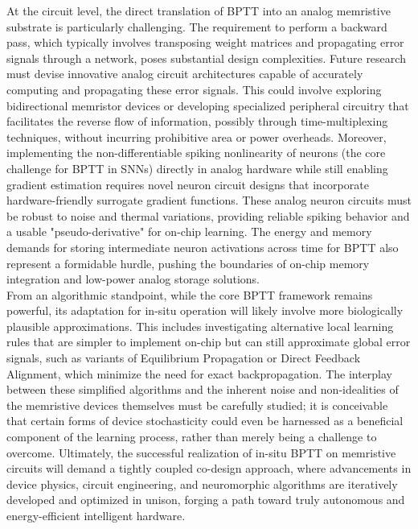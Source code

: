 \noindent At the circuit level, the direct translation of BPTT into an analog memristive substrate is particularly challenging. The requirement to perform a backward pass, which typically involves transposing weight matrices and propagating error signals through a network, poses substantial design complexities. Future research must devise innovative analog circuit architectures capable of accurately computing and propagating these error signals. This could involve exploring bidirectional memristor devices or developing specialized peripheral circuitry that facilitates the reverse flow of information, possibly through time-multiplexing techniques, without incurring prohibitive area or power overheads. Moreover, implementing the non-differentiable spiking nonlinearity of neurons (the core challenge for BPTT in SNNs) directly in analog hardware while still enabling gradient estimation requires novel neuron circuit designs that incorporate hardware-friendly surrogate gradient functions. These analog neuron circuits must be robust to noise and thermal variations, providing reliable spiking behavior and a usable "pseudo-derivative" for on-chip learning. The energy and memory demands for storing intermediate neuron activations across time for BPTT also represent a formidable hurdle, pushing the boundaries of on-chip memory integration and low-power analog storage solutions.\\

\noindent From an algorithmic standpoint, while the core BPTT framework remains powerful, its adaptation for in-situ operation will likely involve more biologically plausible approximations. This includes investigating alternative local learning rules that are simpler to implement on-chip but can still approximate global error signals, such as variants of Equilibrium Propagation or Direct Feedback Alignment, which minimize the need for exact backpropagation. The interplay between these simplified algorithms and the inherent noise and non-idealities of the memristive devices themselves must be carefully studied; it is conceivable that certain forms of device stochasticity could even be harnessed as a beneficial component of the learning process, rather than merely being a challenge to overcome. Ultimately, the successful realization of in-situ BPTT on memristive circuits will demand a tightly coupled co-design approach, where advancements in device physics, circuit engineering, and neuromorphic algorithms are iteratively developed and optimized in unison, forging a path toward truly autonomous and energy-efficient intelligent hardware.\\